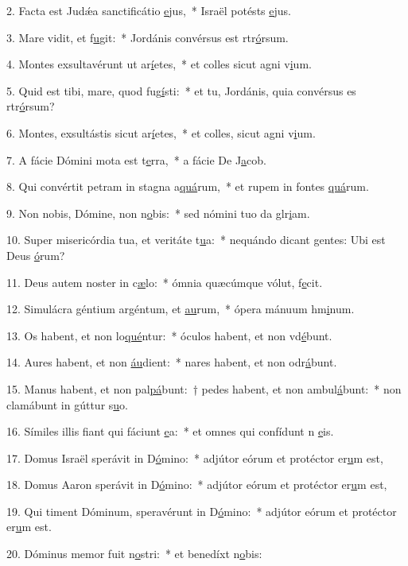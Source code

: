 2. Facta est Judǽa sanctificátio \uline{e}jus,~* Israël potésts \uline{e}jus.\par 
3. Mare vidit, et f\uline{u}git:~* Jordánis convérsus est rtr\uline{ó}rsum.\par 
4. Montes exsultavérunt ut ar\uline{í}etes,~* et colles sicut agni v\uline{i}um.\par 
5. Quid est tibi, mare, quod fug\uline{í}sti:~* et tu, Jordánis, quia convérsus es rtr\uline{ó}rsum?\par 
6. Montes, exsultástis sicut ar\uline{í}etes,~* et colles, sicut agni v\uline{i}um.\par 
7. A fácie Dómini mota est t\uline{e}rra,~* a fácie De J\uline{a}cob.\par 
8. Qui convértit petram in stagna a\uline{quá}rum,~* et rupem in fontes \uline{quá}rum.\par 
9. Non nobis, Dómine, non n\uline{o}bis:~* sed nómini tuo da glr\uline{i}am.\par 
10. Super misericórdia tua, et veritáte t\uline{u}a:~* nequándo dicant gentes: Ubi est Deus \uline{ó}rum?\par 
11. Deus autem noster in c\uline{æ}lo:~* ómnia quæcúmque vólut, f\uline{e}cit.\par 
12. Simulácra géntium argéntum, et \uline{au}rum,~* ópera mánuum hm\uline{i}num.\par 
13. Os habent, et non lo\uline{qué}ntur:~* óculos habent, et non vd\uline{é}bunt.\par 
14. Aures habent, et non \uline{áu}dient:~* nares habent, et non odr\uline{á}bunt.\par 
15. Manus habent, et non pal\uline{pá}bunt:~† pedes habent, et non ambul\uline{á}bunt:~* non clamábunt in gúttur s\uline{u}o.\par 
16. Símiles illis fiant qui fáciunt \uline{e}a:~* et omnes qui confídunt n \uline{e}is.\par 
17. Domus Israël sperávit in D\uline{ó}mino:~* adjútor eórum et protéctor er\uline{u}m est,\par 
18. Domus Aaron sperávit in D\uline{ó}mino:~* adjútor eórum et protéctor er\uline{u}m est,\par 
19. Qui timent Dóminum, speravérunt in D\uline{ó}mino:~* adjútor eórum et protéctor er\uline{u}m est.\par 
20. Dóminus memor fuit n\uline{o}stri:~* et benedíxt n\uline{o}bis:\par 
